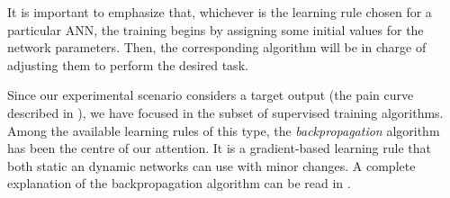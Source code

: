 It is important to emphasize that, whichever is the learning rule
chosen for a particular ANN, the training begins by assigning some
initial values for the network parameters. Then, the corresponding
algorithm will be in charge of adjusting them to perform the desired
task.

Since our experimental scenario considers a target output (the pain
curve described in ), we have focused in the subset
of supervised training algorithms.  Among the available learning rules
of this type, the \emph{backpropagation} algorithm has been the centre
of our attention. It is a gradient-based learning rule that both
static an dynamic networks can use with minor changes. A complete
explanation of the backpropagation algorithm can be read
in .






